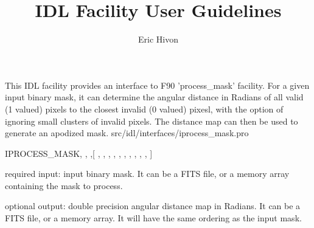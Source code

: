 
\sloppy

\title{\healpix IDL Facility User Guidelines}
 \section[iprocess\_mask]{ }
\label{idl:iprocess_mask}
\author{Eric Hivon}

\begin{facility}
{This IDL facility provides an interface to F90 'process\_mask' facility. For a
given input binary mask, it can determine the angular distance in Radians of all valid (1 valued)
pixels to the closest invalid (0 valued) pixesl, with the option of ignoring small
clusters of invalid pixels. The distance map can then be used to generate an
apodized mask.}
{src/idl/interfaces/iprocess\_mask.pro}
\end{facility}

\begin{IDLformat}
{IPROCESS\_MASK, 
,  
,[
,
,
,
,
,
, 
,
, 
,
,
]}
\end{IDLformat}

\begin{qualifiers}
  \begin{qulist}{} %
   \item[mask\_in]  required input: input binary
mask. It can be a FITS file, or a memory array containing the mask to process.
    \item[distance\_map]  optional
output: double precision angular distance map in Radians. It can be a FITS file, or a
   memory array. It will have the same ordering as the input mask.
  \end{qulist}
\end{qualifiers}

